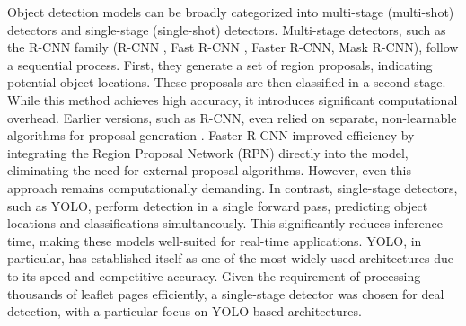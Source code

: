 \documentclass[11pt]{article}
\begin{document}
Object detection models can be broadly categorized into multi-stage (multi-shot) detectors and single-stage (single-shot) detectors. Multi-stage detectors, such as the R-CNN family (R-CNN \cite{girshickRichFeatureHierarchies2014a}, Fast R-CNN \cite{girshickFastRCNN2015}, Faster R-CNN, Mask R-CNN), follow a sequential process. First, they generate a set of region proposals, indicating potential object locations. These proposals are then classified in a second stage. While this method achieves high accuracy, it introduces significant computational overhead. Earlier versions, such as R-CNN, even relied on separate, non-learnable algorithms for proposal generation \cite{uijlingsSelectiveSearchObject2013}. Faster R-CNN improved efficiency by integrating the Region Proposal Network (RPN) directly into the model, eliminating the need for external proposal algorithms. However, even this approach remains computationally demanding. In contrast, single-stage detectors, such as YOLO, perform detection in a single forward pass, predicting object locations and classifications simultaneously. This significantly reduces inference time, making these models well-suited for real-time applications. YOLO, in particular, has established itself as one of the most widely used architectures due to its speed and competitive accuracy. Given the requirement of processing thousands of leaflet pages efficiently, a single-stage detector was chosen for deal detection, with a particular focus on YOLO-based architectures.
\end{document}

